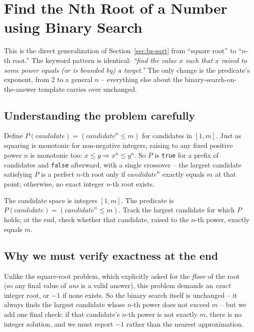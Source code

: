 \section{Find the Nth Root of a Number using Binary Search}
\label{sec:bs-nth-root}


\begin{patternbox}
This is the direct generalization of Section~\ref{sec:bs-sqrt} from
``square root'' to ``$n$-th root.'' The keyword pattern is identical:
\emph{``find the value $x$ such that $x$ raised to some power equals (or
is bounded by) a target.''} The only change is the predicate's exponent,
from $2$ to a general $n$ -- everything else about the binary-search-on-
the-answer template carries over unchanged.
\end{patternbox}

\subsection*{Understanding the problem carefully}

Define $P(\textit{candidate}) = (\textit{candidate}^n \le m)$ for
candidates in $[1, m]$. Just as squaring is monotonic for non-negative
integers, raising to any fixed positive power $n$ is monotonic too:
$x \le y \Rightarrow x^n \le y^n$. So $P$ is \texttt{true} for a prefix of
candidates and \texttt{false} afterward, with a single crossover -- the
largest candidate satisfying $P$ is a perfect $n$-th root only if
$\textit{candidate}^n$ exactly equals $m$ at that point; otherwise, no
exact integer $n$-th root exists.

\begin{ideabox}
The candidate space is integers $[1, m]$. The predicate is
$P(\textit{candidate}) = (\textit{candidate}^n \le m)$. Track the largest
candidate for which $P$ holds; at the end, check whether that candidate,
raised to the $n$-th power, exactly equals $m$.
\end{ideabox}

\subsection*{Why we must verify exactness at the end}

Unlike the square-root problem, which explicitly asked for the
\emph{floor} of the root (so any final value of \textit{ans} is a valid
answer), this problem demands an \emph{exact} integer root, or $-1$ if
none exists. So the binary search itself is unchanged -- it always finds
the largest candidate whose $n$-th power does not exceed $m$ -- but we add
one final check: if that candidate's $n$-th power is not exactly $m$,
there is no integer solution, and we must report $-1$ rather than the
nearest approximation.

